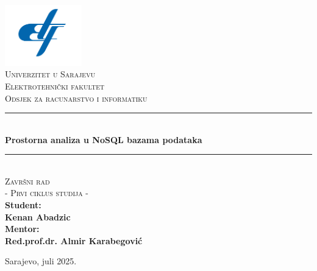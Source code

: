 \documentclass[12pt,oneside, a4paper]{book}
\newcommand{\HRule}{\rule{\linewidth}{0.5mm}}
\begin{document}

\frontmatter

\begin{titlepage}
\begin{center}

\includegraphics[width=0.25\textwidth]{etf-logo.png}~\\[0.1cm]
\textsc{\Large Univerzitet u Sarajevu}\\[0.2cm]  
\textsc{\Large Elektrotehnički fakultet}\\[0.2cm] 
\textsc{\Large Odsjek za racunarstvo i informatiku }\\[3cm]\HRule \\[0.5cm] 
{\huge \bfseries Prostorna analiza u NoSQL bazama podataka} \\[0.4cm] 
\HRule \\[0.5cm]

\textsc{\Large Završni rad}\\[0.4cm]
\textsc{\Large - Prvi ciklus studija - }\\[1.5cm]

\textbf{ 
\Large Student:\\  
\Large Kenan Abadzic\\[1cm]  
\Large Mentor: \\[0.2cm] 
\Large Red.prof.dr. Almir Karabegović\\[0.2cm]} 
\vfill

{\large Sarajevo, juli 2025.}

\end{center} 
\end{titlepage}



\end{document}
